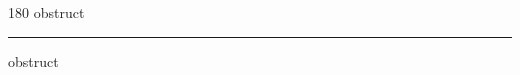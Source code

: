 
\begin{frame}
\begin{center}
\begin{turn}{180}
{\fontsize{2.5cm}{1em}\selectfont obstruct}
\end{turn}
\vspace{1em}\par  
\hrule
\vspace{1em}\par  
{\fontsize{2.5cm}{1em}\selectfont obstruct}
\end{center}
\end{frame}
